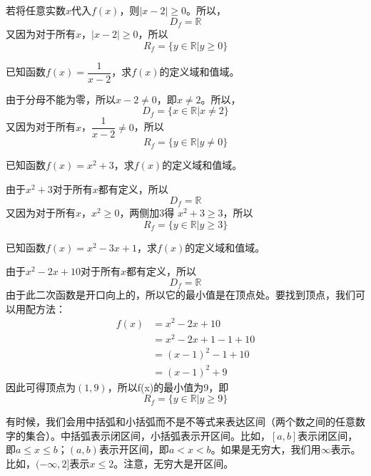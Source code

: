 \documentclass[UTF8]{ctexart}
\begin{document}
\begin{solution}
    若将任意实数$x$代入$f(x)$，则$|x - 2| \geq 0$。所以，
    \[
        D_f = \mathbb{R}
    \]
    又因为对于所有$x$，$|x - 2| \geq 0$，所以
    \[
        R_f = \{y \in \mathbb{R} | y \geq 0\}
    \]
\end{solution}

\begin{question}[（分数函数）]
    已知函数$f(x) = \dfrac{1}{x - 2}$，求$f(x)$的定义域和值域。
\end{question}

\begin{solution}
    由于分母不能为零，所以$x - 2 \neq 0$，即$x \neq 2$。所以，
    \[
        D_f = \{x \in \mathbb{R} | x \neq 2\}
    \]
    又因为对于所有$x$，$\dfrac{1}{x - 2} \neq 0$，所以
    \[
        R_f = \{y \in \mathbb{R} | y \neq 0\}
    \]
\end{solution}

\begin{question}[（增函数）]
    已知函数$f(x) = x^2 + 3$，求$f(x)$的定义域和值域。
\end{question}

\begin{solution}
    由于$x^2 + 3$对于所有$x$都有定义，所以
    \[
        D_f = \mathbb{R}
    \]
    又因为对于所有$x$，$x^2 \geq 0$，两侧加3得 $x^2 + 3 \geq 3$，所以
    \[
        R_f = \{y \in \mathbb{R} | y \geq 3\}
    \]
\end{solution}

\begin{question}[（一元二次函数）]
    已知函数$f(x) = x^2 - 3x + 1$，求$f(x)$的定义域和值域。
\end{question}

\begin{solution}
    由于$x^2 - 2x + 10$对于所有$x$都有定义，所以
    \[
        D_f = \mathbb{R}
    \]
    由于此二次函数是开口向上的，所以它的最小值是在顶点处。要找到顶点，我们可以用配方法：
\begin{align*}
    f(x) &= x^2 - 2x + 10\\
    &= x^2 - 2x + 1 - 1 + 10\\
    &= (x - 1)^2 - 1 + 10\\
    &= (x - 1)^2 + 9
\end{align*}
因此可得顶点为$(1, 9)$，所以f(x)的最小值为9，即
\[
    R_f = \{y \in \mathbb{R} | y \geq 9\}
\]

\end{solution}

\begin{info}[区间表示法]
    有时候，我们会用中括弧和小括弧而不是不等式来表达区间（两个数之间的任意数字的集合）。中括弧表示闭区间，小括弧表示开区间。比如，$[a, b]$表示闭区间，即$a \leq x \leq b$；$(a, b)$表示开区间，即$a < x < b$。如果是无穷大，我们用$\infty$表示。比如，$(-\infty, 2]$表示$x \leq 2$。注意，无穷大是开区间。
\end{info}
\end{document}
